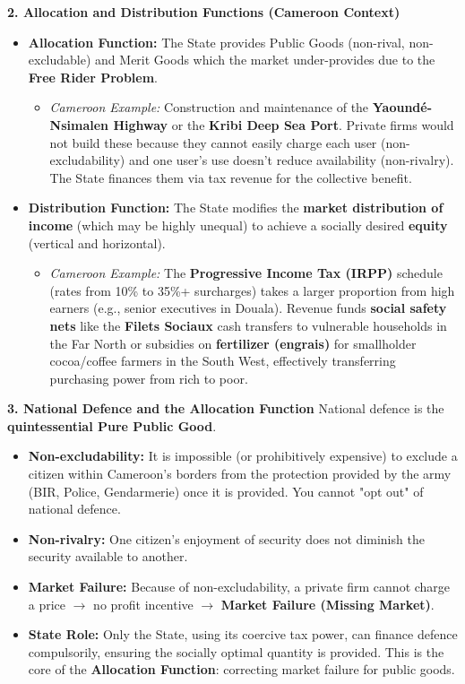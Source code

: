 \documentclass[11pt]{article}
\newcommand{\cle}[1]{{\popxbold\color{popdark}#1}}
\begin{document}
\begin{exoresolu}
\textbf{2. Allocation and Distribution Functions (Cameroon Context)}

\begin{itemize}
    \item \textbf{Allocation Function:} The State provides \cle{Public Goods} (non-rival, non-excludable) and \cle{Merit Goods} which the market under-provides due to the \textbf{Free Rider Problem}.
    \begin{itemize}
        \item \textit{Cameroon Example:} Construction and maintenance of the \textbf{Yaoundé-Nsimalen Highway} or the \textbf{Kribi Deep Sea Port}. Private firms would not build these because they cannot easily charge each user (non-excludability) and one user's use doesn't reduce availability (non-rivalry). The State finances them via tax revenue for the collective benefit.
    \end{itemize}
    \item \textbf{Distribution Function:} The State modifies the \textbf{market distribution of income} (which may be highly unequal) to achieve a socially desired \textbf{equity} (vertical and horizontal).
    \begin{itemize}
        \item \textit{Cameroon Example:} The \textbf{Progressive Income Tax (IRPP)} schedule (rates from 10\% to 35\%+ surcharges) takes a larger proportion from high earners (e.g., senior executives in Douala). Revenue funds \textbf{social safety nets} like the \textbf{Filets Sociaux} cash transfers to vulnerable households in the Far North or subsidies on \textbf{fertilizer (engrais)} for smallholder cocoa/coffee farmers in the South West, effectively transferring purchasing power from rich to poor.
    \end{itemize}
\end{itemize}

\textbf{3. National Defence and the Allocation Function}
National defence is the \textbf{quintessential Pure Public Good}.
\begin{itemize}
    \item \textbf{Non-excludability:} It is impossible (or prohibitively expensive) to exclude a citizen within Cameroon's borders from the protection provided by the army (BIR, Police, Gendarmerie) once it is provided. You cannot "opt out" of national defence.
    \item \textbf{Non-rivalry:} One citizen's enjoyment of security does not diminish the security available to another.
    \item \textbf{Market Failure:} Because of non-excludability, a private firm cannot charge a price $\rightarrow$ no profit incentive $\rightarrow$ \textbf{Market Failure (Missing Market)}.
    \item \textbf{State Role:} Only the State, using its coercive tax power, can finance defence compulsorily, ensuring the socially optimal quantity is provided. This is the core of the \textbf{Allocation Function}: correcting market failure for public goods.
\end{itemize}
\end{exoresolu}
\end{document}
